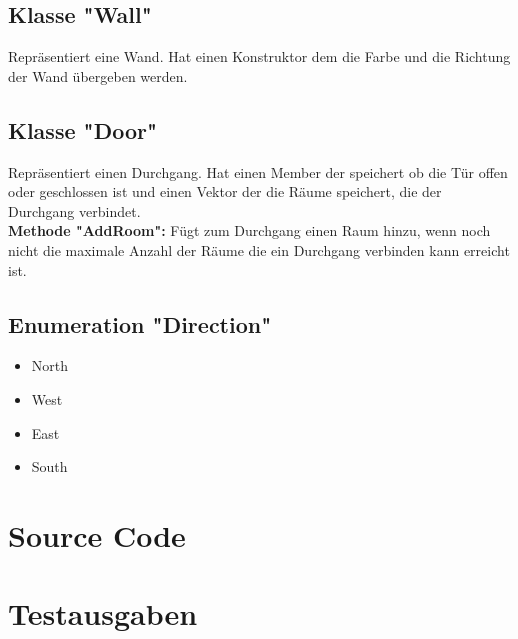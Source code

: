 \documentclass[12pt,a4paper]{article}
\begin{document}
\subsection {Klasse "Wall"} 
Repräsentiert eine Wand. Hat einen Konstruktor dem die Farbe und die Richtung der Wand übergeben werden. \\

\subsection {Klasse "Door"} 
Repräsentiert einen Durchgang. Hat einen Member der speichert ob die Tür offen oder geschlossen ist und einen Vektor der die Räume speichert, die der Durchgang verbindet. \\

\textbf {Methode "AddRoom":}
Fügt zum Durchgang einen Raum hinzu, wenn noch nicht die maximale Anzahl der Räume die ein Durchgang verbinden kann erreicht ist.

\subsection {Enumeration "Direction"}
\begin {itemize}
	\item North
	\item West
	\item East
	\item South
\end {itemize}


\newpage
\section {Source Code}


\newpage


\newpage

\newpage


\newpage

\newpage


\newpage

\newpage


\newpage

\newpage


\newpage

\newpage


\newpage


\newpage



\newpage
\section {Testausgaben} 

\begin {verbatim}

\end {verbatim}
\end{document}
